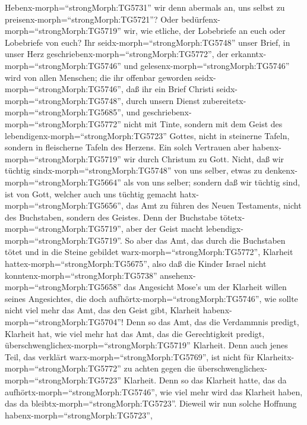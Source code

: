  Hebenx-morph=``strongMorph:TG5731'' wir denn abermals an,
uns selbst zu preisenx-morph=``strongMorph:TG5721''? Oder
bedürfenx-morph=``strongMorph:TG5719'' wir, wie etliche, der Lobebriefe
an euch oder Lobebriefe von euch?  Ihr
seidx-morph=``strongMorph:TG5748'' unser Brief, in unser Herz
geschriebenx-morph=``strongMorph:TG5772'', der
erkanntx-morph=``strongMorph:TG5746'' und
gelesenx-morph=``strongMorph:TG5746'' wird von allen Menschen;
 die ihr offenbar geworden
seidx-morph=``strongMorph:TG5746'', daß ihr ein Brief Christi
seidx-morph=``strongMorph:TG5748'', durch unsern Dienst
zubereitetx-morph=``strongMorph:TG5685'', und
geschriebenx-morph=``strongMorph:TG5772'' nicht mit Tinte, sondern mit
dem Geist des lebendigenx-morph=``strongMorph:TG5723'' Gottes, nicht in
steinerne Tafeln, sondern in fleischerne Tafeln des Herzens.
 Ein solch Vertrauen aber
habenx-morph=``strongMorph:TG5719'' wir durch Christum zu Gott.
 Nicht, daß wir tüchtig sindx-morph=``strongMorph:TG5748''
von uns selber, etwas zu denkenx-morph=``strongMorph:TG5664'' als von
uns selber; sondern daß wir tüchtig sind, ist von Gott, 
welcher auch uns tüchtig gemacht hatx-morph=``strongMorph:TG5656'', das
Amt zu führen des Neuen Testaments, nicht des Buchstaben, sondern des
Geistes. Denn der Buchstabe tötetx-morph=``strongMorph:TG5719'', aber
der Geist macht lebendigx-morph=``strongMorph:TG5719''.  So
aber das Amt, das durch die Buchstaben tötet und in die Steine gebildet
warx-morph=``strongMorph:TG5772'', Klarheit
hattex-morph=``strongMorph:TG5675'', also daß die Kinder Israel nicht
konntenx-morph=``strongMorph:TG5738''
ansehenx-morph=``strongMorph:TG5658'' das Angesicht Mose's um der
Klarheit willen seines Angesichtes, die doch
aufhörtx-morph=``strongMorph:TG5746'',  wie sollte nicht
viel mehr das Amt, das den Geist gibt, Klarheit
habenx-morph=``strongMorph:TG5704''!  Denn so das Amt, das
die Verdammnis predigt, Klarheit hat, wie viel mehr hat das Amt, das die
Gerechtigkeit predigt, überschwenglichex-morph=``strongMorph:TG5719''
Klarheit.  Denn auch jenes Teil, das verklärt
warx-morph=``strongMorph:TG5769'', ist nicht für
Klarheitx-morph=``strongMorph:TG5772'' zu achten gegen die
überschwenglichex-morph=``strongMorph:TG5723'' Klarheit. 
Denn so das Klarheit hatte, das da
aufhörtx-morph=``strongMorph:TG5746'', wie viel mehr wird das Klarheit
haben, das da bleibtx-morph=``strongMorph:TG5723''. 
Dieweil wir nun solche Hoffnung habenx-morph=``strongMorph:TG5723'',
